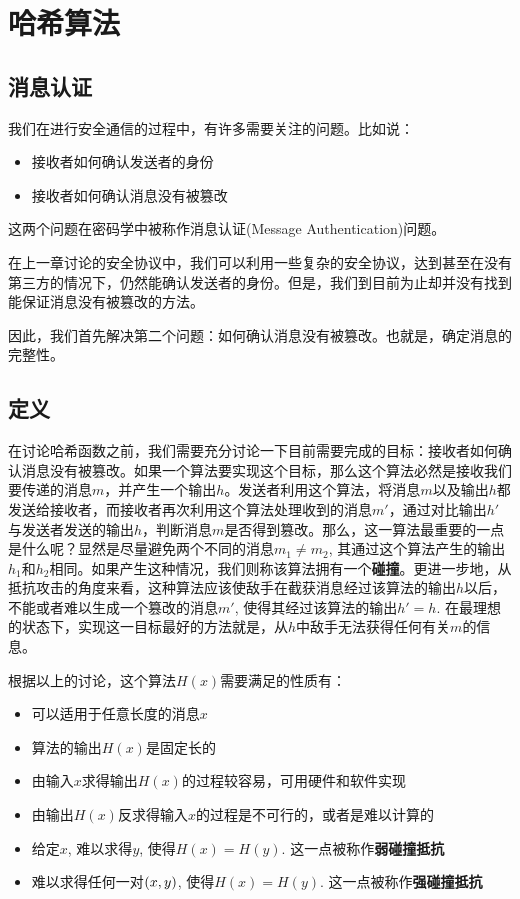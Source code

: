 \chapter{哈希算法}
\section{消息认证}
我们在进行安全通信的过程中，有许多需要关注的问题。比如说：
\begin{itemize}
	\item 接收者如何确认发送者的身份
	\item 接收者如何确认消息没有被篡改
\end{itemize}

这两个问题在密码学中被称作消息认证(Message Authentication)问题。\par
在上一章讨论的安全协议中，我们可以利用一些复杂的安全协议，达到甚至在没有第三方的情况下，仍然能确认发送者的身份。但是，我们到目前为止却并没有找到能保证消息没有被篡改的方法。\par
因此，我们首先解决第二个问题：如何确认消息没有被篡改。也就是，确定消息的完整性。
\section{定义}
在讨论哈希函数之前，我们需要充分讨论一下目前需要完成的目标：接收者如何确认消息没有被篡改。如果一个算法要实现这个目标，那么这个算法必然是接收我们要传递的消息$m$，并产生一个输出$h$。发送者利用这个算法，将消息$m$以及输出$h$都发送给接收者，而接收者再次利用这个算法处理收到的消息$m'$，通过对比输出$h'$与发送者发送的输出$h$，判断消息$m$是否得到篡改。那么，这一算法最重要的一点是什么呢？显然是尽量避免两个不同的消息$m_1\neq m_2$, 其通过这个算法产生的输出$h_1$和$h_2$相同。如果产生这种情况，我们则称该算法拥有一个\textbf{碰撞}。更进一步地，从抵抗攻击的角度来看，这种算法应该使敌手在截获消息经过该算法的输出$h$以后，不能或者难以生成一个篡改的消息$m'$, 使得其经过该算法的输出$h'=h$. 在最理想的状态下，实现这一目标最好的方法就是，从$h$中敌手无法获得任何有关$m$的信息。\par
根据以上的讨论，这个算法$H(x)$需要满足的性质有：
\begin{itemize}
	\item 可以适用于任意长度的消息$x$
	\item 算法的输出$H(x)$是固定长的
	\item 由输入$x$求得输出$H(x)$的过程较容易，可用硬件和软件实现
	\item 由输出$H(x)$反求得输入$x$的过程是不可行的，或者是难以计算的
	\item 给定$x$, 难以求得$y$, 使得$H(x)=H(y)$. 这一点被称作\textbf{弱碰撞抵抗}
	\item 难以求得任何一对$\left( {x, y}\right)$, 使得$H(x)=H(y)$. 这一点被称作\textbf{强碰撞抵抗}
\end{itemize}

